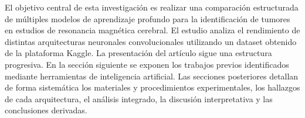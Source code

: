 El objetivo central de esta investigación es realizar una comparación estructurada de múltiples modelos de aprendizaje profundo para la identificación de tumores en estudios de resonancia magnética cerebral. El estudio analiza el rendimiento de distintas arquitecturas neuronales convolucionales utilizando un dataset obtenido de la plataforma Kaggle. La presentación del artículo sigue una estructura progresiva. En la sección siguiente se exponen los trabajos previos identificados mediante herramientas de inteligencia artificial. Las secciones posteriores detallan de forma sistemática los materiales y procedimientos experimentales, los hallazgos de cada arquitectura, el análisis integrado, la discusión interpretativa y las conclusiones derivadas.
